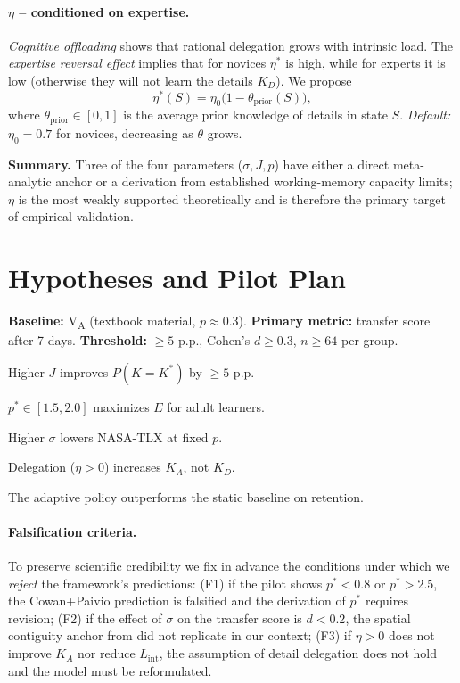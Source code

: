\documentclass[10pt,a4paper]{article}
\begin{document}
\paragraph{$\eta$ – conditioned on expertise.}
\emph{Cognitive offloading} \cite{riskogilbert2016} shows that rational
delegation grows with intrinsic load. The \emph{expertise reversal
effect} \cite{kalyuga2007} implies that for novices $\eta^{*}$ is high,
while for experts it is low (otherwise they will not learn the details
$K_D$). We propose
\begin{equation}
\eta^{*}(S) = \eta_0 \bigl(1 - \theta_{\text{prior}}(S)\bigr),
\end{equation}
where $\theta_{\text{prior}} \in [0,1]$ is the average prior knowledge
of details in state $S$. \emph{Default:} $\eta_0 = 0.7$ for novices,
decreasing as $\theta$ grows.

\medskip
\noindent \textbf{Summary.} Three of the four parameters
($\sigma, J, p$) have either a direct meta-analytic anchor or a
derivation from established working-memory capacity limits; $\eta$ is
the most weakly supported theoretically and is therefore the primary
target of empirical validation.

\section{Hypotheses and Pilot Plan}

\textbf{Baseline:} V\textsubscript{A} (textbook material,
$p\!\approx\!0.3$).
\textbf{Primary metric:} transfer score after 7 days.
\textbf{Threshold:} $\geq 5$ p.p., Cohen's $d \geq 0.3$,
$n \geq 64$ per group.

\begin{description}[leftmargin=2em, style=nextline, itemsep=0pt]
  \item[$H_1$] Higher $J$ improves $P(\hat K = K^{*})$ by $\geq 5$ p.p.
  \item[$H_2$] $p^{*} \in [1.5, 2.0]$ maximizes $E$ for adult learners.
  \item[$H_3$] Higher $\sigma$ lowers NASA-TLX at fixed $p$.
  \item[$H_4$] Delegation ($\eta > 0$) increases $K_A$, not $K_D$.
  \item[$H_5$] The adaptive policy outperforms the static baseline on retention.
\end{description}

\paragraph{Falsification criteria.}
To preserve scientific credibility we fix in advance the conditions
under which we \emph{reject} the framework's predictions:
(F1) if the pilot shows $p^{*} < 0.8$ or $p^{*} > 2.5$, the Cowan+Paivio
prediction is falsified and the derivation of $p^{*}$ requires revision;
(F2) if the effect of $\sigma$ on the transfer score is $d < 0.2$, the
spatial contiguity anchor from \cite{ginns2006} did not replicate in
our context;
(F3) if $\eta > 0$ does not improve $K_A$ nor reduce $L_{\text{int}}$,
the assumption of detail delegation does not hold and the model must
be reformulated.
\end{document}
